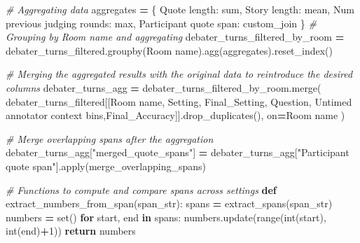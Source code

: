 \documentclass[
]{article}
\newenvironment{Shaded}{\begin{snugshade}}{\end{snugshade}}
\newcommand{\BuiltInTok}[1]{#1}
\newcommand{\CommentTok}[1]{\textcolor[rgb]{0.56,0.35,0.01}{\textit{#1}}}
\newcommand{\ControlFlowTok}[1]{\textcolor[rgb]{0.13,0.29,0.53}{\textbf{#1}}}
\newcommand{\DecValTok}[1]{\textcolor[rgb]{0.00,0.00,0.81}{#1}}
\newcommand{\KeywordTok}[1]{\textcolor[rgb]{0.13,0.29,0.53}{\textbf{#1}}}
\newcommand{\NormalTok}[1]{#1}
\newcommand{\OperatorTok}[1]{\textcolor[rgb]{0.81,0.36,0.00}{\textbf{#1}}}
\newcommand{\StringTok}[1]{\textcolor[rgb]{0.31,0.60,0.02}{#1}}
\begin{document}
\begin{Shaded}
\begin{Highlighting}[]
\CommentTok{\# Aggregating data}
\NormalTok{aggregates }\OperatorTok{=}\NormalTok{ \{}
    \StringTok{\textquotesingle{}Quote length\textquotesingle{}}\NormalTok{: }\StringTok{\textquotesingle{}sum\textquotesingle{}}\NormalTok{,}
    \StringTok{\textquotesingle{}Story length\textquotesingle{}}\NormalTok{: }\StringTok{\textquotesingle{}mean\textquotesingle{}}\NormalTok{,}
    \StringTok{\textquotesingle{}Num previous judging rounds\textquotesingle{}}\NormalTok{: }\StringTok{\textquotesingle{}max\textquotesingle{}}\NormalTok{,}
    \StringTok{\textquotesingle{}Participant quote span\textquotesingle{}}\NormalTok{: custom\_join}
\NormalTok{\}}
\CommentTok{\# Grouping by \textquotesingle{}Room name\textquotesingle{} and aggregating}
\NormalTok{debater\_turns\_filtered\_by\_room }\OperatorTok{=}\NormalTok{ debater\_turns\_filtered.groupby(}\StringTok{\textquotesingle{}Room name\textquotesingle{}}\NormalTok{).agg(aggregates).reset\_index()}

\CommentTok{\# Merging the aggregated results with the original data to reintroduce the desired columns}
\NormalTok{debater\_turns\_agg }\OperatorTok{=}\NormalTok{ debater\_turns\_filtered\_by\_room.merge(}
\NormalTok{    debater\_turns\_filtered[[}\StringTok{\textquotesingle{}Room name\textquotesingle{}}\NormalTok{, }\StringTok{\textquotesingle{}Setting\textquotesingle{}}\NormalTok{, }\StringTok{\textquotesingle{}Final\_Setting\textquotesingle{}}\NormalTok{, }\StringTok{\textquotesingle{}Question\textquotesingle{}}\NormalTok{, }\StringTok{\textquotesingle{}Untimed annotator context bins\textquotesingle{}}\NormalTok{,}\StringTok{\textquotesingle{}Final\_Accuracy\textquotesingle{}}\NormalTok{]].drop\_duplicates(),}
\NormalTok{    on}\OperatorTok{=}\StringTok{\textquotesingle{}Room name\textquotesingle{}}
\NormalTok{)}

\CommentTok{\# Merge overlapping spans after the aggregation}
\NormalTok{debater\_turns\_agg[}\StringTok{"merged\_quote\_spans"}\NormalTok{] }\OperatorTok{=}\NormalTok{ debater\_turns\_agg[}\StringTok{"Participant quote span"}\NormalTok{].}\BuiltInTok{apply}\NormalTok{(merge\_overlapping\_spans)}

\CommentTok{\# Functions to compute and compare spans across settings}
\KeywordTok{def}\NormalTok{ extract\_numbers\_from\_span(span\_str):}
\NormalTok{    spans }\OperatorTok{=}\NormalTok{ extract\_spans(span\_str)}
\NormalTok{    numbers }\OperatorTok{=} \BuiltInTok{set}\NormalTok{()}
    \ControlFlowTok{for}\NormalTok{ start, end }\KeywordTok{in}\NormalTok{ spans:}
\NormalTok{        numbers.update(}\BuiltInTok{range}\NormalTok{(}\BuiltInTok{int}\NormalTok{(start), }\BuiltInTok{int}\NormalTok{(end)}\OperatorTok{+}\DecValTok{1}\NormalTok{))}
    \ControlFlowTok{return}\NormalTok{ numbers}


\end{Highlighting}
\end{Shaded}
\end{document}
